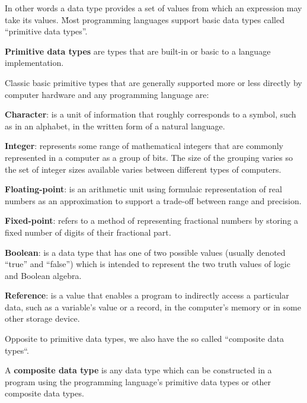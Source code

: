 In other words a data type provides a set of values from which an expression may take its values. \v

Most programming languages support basic data types called ``primitive data types''.

\textbf{Primitive data types} are types that are built-in or basic to a language implementation.
\ed

\be
Classic basic primitive types that are generally supported more or less directly by computer hardware and any
programming language are:
\bit
\item \textbf{Character}: is a unit of information that roughly corresponds to a symbol, such as in an alphabet, in the
written form of a natural language.
\item \textbf{Integer}: represents some range of mathematical integers that are commonly represented in a computer as
a group of bits. The size of the grouping varies so the set of integer sizes available varies between different types
of computers.
\item \textbf{Floating-point}: is an arithmetic unit using formulaic representation of real numbers as an approximation
to support a trade-off between range and precision.
\item \textbf{Fixed-point}: refers to a method of representing fractional numbers by storing a fixed number of digits of
their fractional part.
\item \textbf{Boolean}: is a data type that has one of two possible values (usually denoted ``true'' and ``false'')
which is intended to represent the two truth values of logic and Boolean algebra.
\item \textbf{Reference}: is a value that enables a program to indirectly access a particular data, such as a variable's
value or a record, in the computer's memory or in some other storage device.
\eit
\ee

Opposite to primitive data types, we also have the so called ``composite data types``.

A \textbf{composite data type} is any data type which can be constructed in a program using the programming
language's primitive data types or other composite data types.
\ed